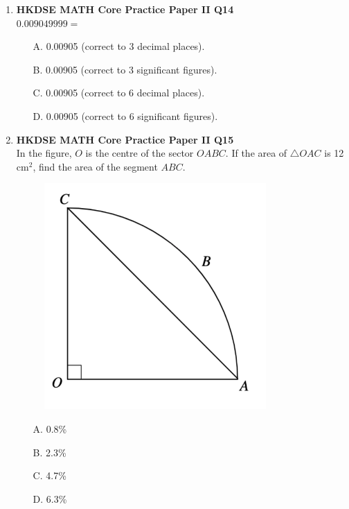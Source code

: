 \documentclass[12pt]{article}
\begin{document}
\begin{enumerate}
	\item \textbf{HKDSE MATH Core Practice Paper II Q14}\\
	$0.009049999 =$
	\begin{enumerate}
		\item[A.] 0.00905 (correct to 3 decimal places).
		\item[B.] 0.00905 (correct to 3 significant figures).
		\item[C.] 0.00905 (correct to 6 decimal places).
		\item[D.] 0.00905 (correct to 6 significant figures).
	\end{enumerate}

	\item \textbf{HKDSE MATH Core Practice Paper II Q15}\\
	In the figure, $O$ is the centre of the sector $OABC$. If the area of $\triangle OAC$ is 12 cm$^2$, find the area of the segment $ABC$.
	\begin{figure}[H]
		\centering
		\includegraphics[width = 0.8\textwidth]{PPFigure2.15}
	\end{figure}
	\begin{enumerate}
		\item[A.] 0.8\%
		\item[B.] 2.3\%
		\item[C.] 4.7\%
		\item[D.] 6.3\%
	\end{enumerate}


\end{enumerate}
\end{document}
